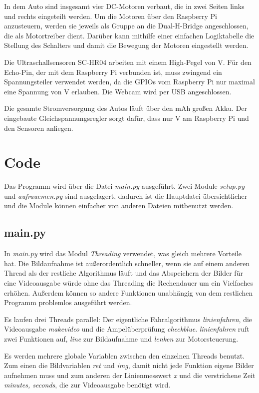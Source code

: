 \documentclass[a4paper, 12pt]{scrartcl}
\begin{document}
In dem Auto sind insgesamt vier DC-Motoren verbaut, die in zwei Seiten links und rechts eingeteilt werden. Um die Motoren über den Raspberry Pi anzusteuern, werden sie jeweils als Gruppe an die Dual-H-Bridge angeschlossen, die als Motortreiber dient. Darüber kann mithilfe einer einfachen Logiktabelle die Stellung des Schalters und damit die Bewegung der Motoren eingestellt werden.

Die Ultraschallsensoren SC-HR04 arbeiten mit einem High-Pegel von \unit[5]{V}. Für den Echo-Pin, der mit dem Raspberry Pi verbunden ist, muss zwingend ein Spannungsteiler verwendet werden, da die GPIOs vom Raspberry Pi nur maximal eine Spannung von \unit[3,3]{V} erlauben. Die Webcam wird per USB angeschlossen.

Die gesamte Stromversorgung des Autos läuft über den \unit[4000]{mAh} großen Akku. Der eingebaute Gleichspannungsregler sorgt dafür, dass nur \unit[5]{V} am Raspberry Pi und den Sensoren anliegen.

\section{Code}

Das Programm wird über die Datei \textit{main.py} ausgeführt. Zwei Module \textit{setup.py} und \textit{aufrauemen.py} sind ausgelagert, dadurch ist die Hauptdatei übersichtlicher und die Module können einfacher von anderen Dateien mitbenutzt werden.

\subsection{main.py}

In \textit{main.py} wird das Modul \textit{Threading} verwendet, was gleich mehrere Vorteile hat. Die Bildaufnahme ist außerordentlich schneller, wenn sie auf einem anderen Thread als der restliche Algorithmus läuft und das Abspeichern der Bilder für eine Videoausgabe würde ohne das Threading die Rechendauer um ein Vielfaches erhöhen. Außerdem können so andere Funktionen unabhängig von dem restlichen Programm problemlos ausgeführt werden.

Es laufen drei Threads parallel: Der eigentliche Fahralgorithmus \textit{linienfahren}, die Videoausgabe \textit{makevideo} und die Ampelüberprüfung \textit{checkblue}. \textit{linienfahren} ruft zwei Funktionen auf, \textit{line} zur Bildaufnahme und \textit{lenken} zur Motorsteuerung.

Es werden mehrere globale Variablen zwischen den einzelnen Threads benutzt. Zum einen die Bildvariablen \textit{ret} und \textit{img}, damit nicht jede Funktion eigene Bilder aufnehmen muss und zum anderen der Linienmesswert \textit{x} und die verstrichene Zeit \textit{minutes, seconds}, die zur Videoausgabe benötigt wird.
\end{document}
